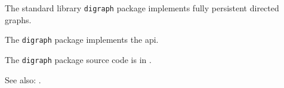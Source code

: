 
The standard library {\tt digraph} package implements fully persistent directed graphs.

The {\tt digraph} package implements the  api.

The {\tt digraph} package source code is in .

See also:  .



